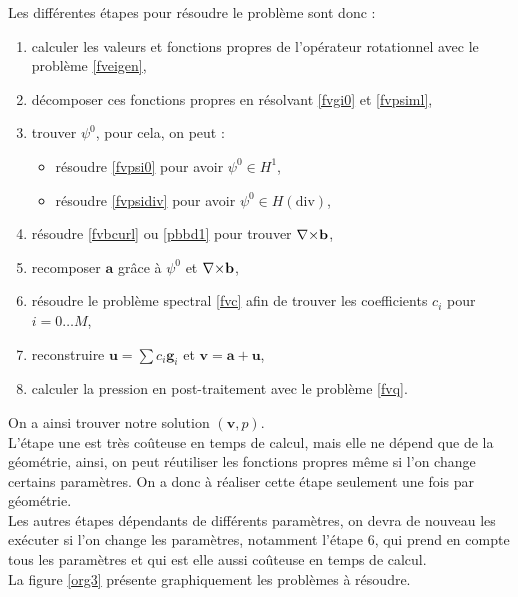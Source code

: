 Les différentes étapes pour résoudre le problème sont donc :
\begin{enumerate}
\item calculer les valeurs et fonctions propres de l'opérateur rotationnel avec le problème \ref{fveigen},
\item décomposer ces fonctions propres en résolvant \ref{fvgi0} et \ref{fvpsiml},
\item trouver $\psi^0$, pour cela, on peut :
\begin{itemize}
\item résoudre \ref{fvpsi0} pour avoir $\psi^0\in H^1$,
\item résoudre \ref{fvpsidiv} pour avoir $\psi^0\in H(\mathrm{div})$,
\end{itemize}
\item résoudre \ref{fvbcurl} ou \ref{pbbd1} pour trouver ${\nabla\times}\mathbf{b}$,
\item recomposer $\mathbf{a}$ grâce à $\psi^0$ et ${\nabla\times}\mathbf{b}$,
\item résoudre le problème spectral \ref{fvc} afin de trouver les coefficients $c_i$ pour $i=0\dots M$,
\item reconstruire $\mathbf{u}=\sum c_i \mathbf{g}_i$ et $\mathbf{v}=\mathbf{a}+\mathbf{u}$,
\item calculer la pression en post-traitement avec le problème \ref{fvq}.
\end{enumerate}

On a ainsi trouver notre solution $(\mathbf{v},p)$.\\
L'étape une est très coûteuse en temps de calcul, mais elle ne dépend que de la géométrie, ainsi, on peut réutiliser les fonctions propres même si l'on change certains paramètres. On a donc à réaliser cette étape seulement une fois par géométrie.\\
Les autres étapes dépendants de différents paramètres, on devra de nouveau les exécuter si l'on change les paramètres, notamment l'étape 6, qui prend en compte tous les paramètres et qui est elle aussi coûteuse en temps de calcul.\\

La figure \ref{org3} présente graphiquement les problèmes à résoudre.\\

